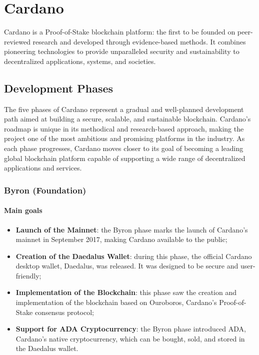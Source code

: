 \chapter{Cardano}

Cardano is a \gls{Proof-of-Stake} blockchain platform: the first 
to be founded on peer-reviewed research and developed through 
evidence-based methods. It combines pioneering technologies 
to provide unparalleled security and sustainability to decentralized 
applications, systems, and societies.

\section{Development Phases}

The five phases of Cardano represent a gradual and well-planned development 
path aimed at building a secure, scalable, and sustainable blockchain. 
Cardano's roadmap is unique in its methodical and research-based approach, 
making the project one of the most ambitious and promising platforms in the 
industry. As each phase progresses, Cardano moves closer to its goal of 
becoming a leading global blockchain platform capable of supporting a wide 
range of decentralized applications and services.

\vspace{0.2cm}

\subsection{Byron (Foundation)}

\subsubsection*{Main goals}
\begin{itemize}
    \item \textbf{Launch of the Mainnet}: the Byron phase marks the launch of 
        Cardano's mainnet in September 2017, making Cardano available 
        to the public;
    \item \textbf{Creation of the Daedalus Wallet}: during this phase, the 
        official Cardano desktop wallet, Daedalus, was released. It was 
        designed to be secure and user-friendly;

    \item \textbf{Implementation of the Blockchain}: this phase saw the 
        creation and implementation of the blockchain based on Ouroboros, 
        Cardano's Proof-of-Stake consensus protocol;

    \item \textbf{Support for ADA Cryptocurrency}: the Byron phase introduced 
        ADA, Cardano's native cryptocurrency, which can be bought, sold, and 
        stored in the Daedalus wallet.
\end{itemize}

